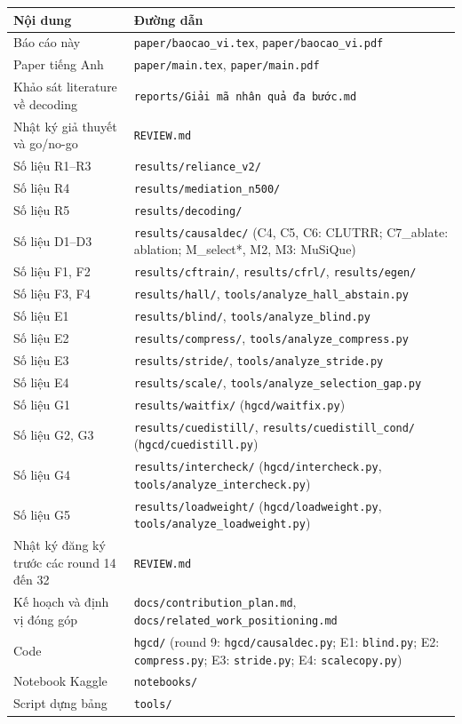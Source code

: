 \documentclass[11pt]{article}
\begin{document}
\begin{table}[h]
\centering\small
\begin{tabularx}{\linewidth}{@{}l>{\raggedright\arraybackslash}X@{}}
\toprule
Nội dung & Đường dẫn \\
\midrule
Báo cáo này & \texttt{paper/baocao\_vi.tex}, \texttt{paper/baocao\_vi.pdf} \\
Paper tiếng Anh & \texttt{paper/main.tex}, \texttt{paper/main.pdf} \\
Khảo sát literature về decoding & \texttt{reports/Giải mã nhân quả đa bước.md} \\
Nhật ký giả thuyết và go/no-go & \texttt{REVIEW.md} \\
Số liệu R1--R3 & \texttt{results/reliance\_v2/} \\
Số liệu R4 & \texttt{results/mediation\_n500/} \\
Số liệu R5 & \texttt{results/decoding/} \\
Số liệu D1--D3 & \texttt{results/causaldec/} (C4, C5, C6: CLUTRR; C7\_ablate: ablation;
  M\_select*, M2, M3: MuSiQue) \\
Số liệu F1, F2 & \texttt{results/cftrain/}, \texttt{results/cfrl/}, \texttt{results/egen/} \\
Số liệu F3, F4 & \texttt{results/hall/}, \texttt{tools/analyze\_hall\_abstain.py} \\
Số liệu E1 & \texttt{results/blind/}, \texttt{tools/analyze\_blind.py} \\
Số liệu E2 & \texttt{results/compress/}, \texttt{tools/analyze\_compress.py} \\
Số liệu E3 & \texttt{results/stride/}, \texttt{tools/analyze\_stride.py} \\
Số liệu E4 & \texttt{results/scale/}, \texttt{tools/analyze\_selection\_gap.py} \\
Số liệu G1 & \texttt{results/waitfix/} (\texttt{hgcd/waitfix.py}) \\
Số liệu G2, G3 & \texttt{results/cuedistill/}, \texttt{results/cuedistill\_cond/} (\texttt{hgcd/cuedistill.py}) \\
Số liệu G4 & \texttt{results/intercheck/} (\texttt{hgcd/intercheck.py}, \texttt{tools/analyze\_intercheck.py}) \\
Số liệu G5 & \texttt{results/loadweight/} (\texttt{hgcd/loadweight.py}, \texttt{tools/analyze\_loadweight.py}) \\
Nhật ký đăng ký trước các round 14 đến 32 & \texttt{REVIEW.md} \\
Kế hoạch và định vị đóng góp & \texttt{docs/contribution\_plan.md}, \texttt{docs/related\_work\_positioning.md} \\
Code & \texttt{hgcd/} (round 9: \texttt{hgcd/causaldec.py}; E1: \texttt{blind.py}; E2: \texttt{compress.py};
  E3: \texttt{stride.py}; E4: \texttt{scalecopy.py}) \\
Notebook Kaggle & \texttt{notebooks/} \\
Script dựng bảng & \texttt{tools/} \\
\bottomrule
\end{tabularx}
\end{table}
\end{document}
